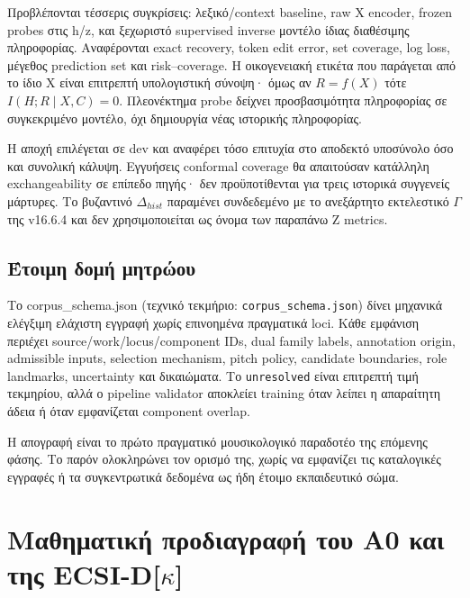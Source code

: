 \documentclass[
  10pt,
  a4paper,
]{report}
\begin{document}
Προβλέπονται τέσσερις συγκρίσεις: λεξικό/context baseline, raw X
encoder, frozen probes στις h/z, και ξεχωριστό supervised inverse
μοντέλο ίδιας διαθέσιμης πληροφορίας. Αναφέρονται exact recovery, token
edit error, set coverage, log loss, μέγεθος prediction set και
risk--coverage. Η οικογενειακή ετικέτα που παράγεται από το ίδιο X είναι
επιτρεπτή υπολογιστική σύνοψη· όμως αν \(R=f(X)\) τότε
\(I(H;R\mid X,C)=0\). Πλεονέκτημα probe δείχνει προσβασιμότητα
πληροφορίας σε συγκεκριμένο μοντέλο, όχι δημιουργία νέας ιστορικής
πληροφορίας.

Η αποχή επιλέγεται σε dev και αναφέρει τόσο επιτυχία στο αποδεκτό
υποσύνολο όσο και συνολική κάλυψη. Εγγυήσεις conformal coverage θα
απαιτούσαν κατάλληλη exchangeability σε επίπεδο πηγής· δεν
προϋποτίθενται για τρεις ιστορικά συγγενείς μάρτυρες. Το βυζαντινό
\(\Delta_{hist}\) παραμένει συνδεδεμένο με το ανεξάρτητο εκτελεστικό
\(\Gamma\) της v16.6.4 και δεν χρησιμοποιείται ως όνομα των παραπάνω Z
metrics.

\section{Έτοιμη δομή
μητρώου}\label{ux3adux3c4ux3bfux3b9ux3bcux3b7-ux3b4ux3bfux3bcux3ae-ux3bcux3b7ux3c4ux3c1ux3ceux3bfux3c5}

Το corpus\_schema.json (τεχνικό τεκμήριο: \texttt{corpus\_schema.json})
δίνει μηχανικά ελέγξιμη ελάχιστη εγγραφή χωρίς επινοημένα πραγματικά
loci. Κάθε εμφάνιση περιέχει source/work/locus/component IDs, dual
family labels, annotation origin, admissible inputs, selection
mechanism, pitch policy, candidate boundaries, role landmarks,
uncertainty και δικαιώματα. Το \texttt{unresolved} είναι επιτρεπτή τιμή
τεκμηρίου, αλλά ο pipeline validator αποκλείει training όταν λείπει η
απαραίτητη άδεια ή όταν εμφανίζεται component overlap.

Η απογραφή είναι το πρώτο πραγματικό μουσικολογικό παραδοτέο της
επόμενης φάσης. Το παρόν ολοκληρώνει τον ορισμό της, χωρίς να εμφανίζει
τις καταλογικές εγγραφές ή τα συγκεντρωτικά δεδομένα ως ήδη έτοιμο
εκπαιδευτικό σώμα.

\chapter{\texorpdfstring{Μαθηματική προδιαγραφή του A0 και της
ECSI-D{[}\(\kappa\){]}}{Μαθηματική προδιαγραφή του A0 και της ECSI-D{[}\textbackslash kappa{]}}}\label{ux3bcux3b1ux3b8ux3b7ux3bcux3b1ux3c4ux3b9ux3baux3ae-ux3c0ux3c1ux3bfux3b4ux3b9ux3b1ux3b3ux3c1ux3b1ux3c6ux3ae-ux3c4ux3bfux3c5-a0-ux3baux3b1ux3b9-ux3c4ux3b7ux3c2-ecsi-dkappa}
\end{document}
